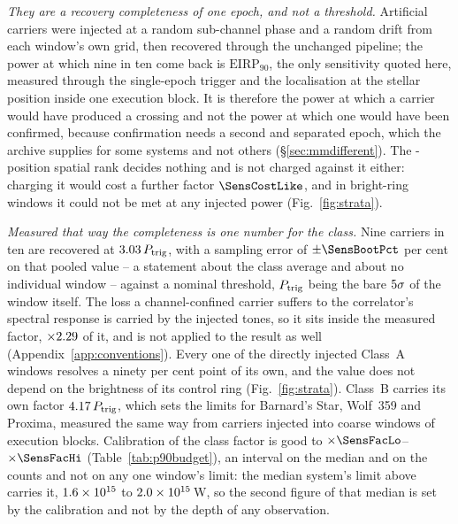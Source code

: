 \emph{They are a recovery completeness of one epoch, and not a threshold.}
Artificial carriers were injected at a random sub-channel phase and a random
drift from each window's own grid, then recovered through the unchanged
pipeline; the power at which nine in ten come back is $\mathrm{EIRP}_{90}$, the
only sensitivity quoted here, measured through the single-epoch trigger and the
localisation at the stellar position inside one execution block. It is
therefore the power at which a carrier would have produced a crossing and not
the power at which one would have been confirmed, because confirmation needs a
second and separated epoch, which the archive supplies for some systems and not
others (\S\ref{sec:mmdifferent}). The \NCtrl-position spatial rank decides
nothing and is not charged against it either: charging it would cost a further
factor $\SensCostLike$, and in \SensNRingHiUnres{} bright-ring windows it could
not be met at any injected power (Fig.~\ref{fig:strata}).

\emph{Measured that way the completeness is one number for the class.} Nine
carriers in ten are recovered at $3.03\,P_{\rm trig}$, with a
sampling error of $\pm\SensBootPct$ per cent on that pooled value -- a
statement about the class average and about no individual window -- against a
nominal threshold, $P_{\rm trig}$ being the bare $5\sigma$ of the
window itself. The loss a channel-confined carrier suffers to the correlator's
spectral response is carried by the injected tones, so it sits inside the
measured factor, $\times2.29$ of it, and is not applied to the result as
well (Appendix~\ref{app:conventions}). Every one of the \SensNInj{} directly
injected Class~A windows resolves a ninety per cent point of its own, and the
value does not depend on the brightness of its control ring
(Fig.~\ref{fig:strata}). Class~B carries its own factor $4.17\,P_{\rm
trig}$, which sets the limits for Barnard's Star, Wolf~359 and Proxima,
measured the same way from \SensNToneCoarse{} carriers injected into
\SensNInjCoarse{} coarse windows of \SensNInjCoarseBlock{} execution
blocks. Calibration of the class factor is good to
$\times\SensFacLo$--$\times\SensFacHi$ (Table~\ref{tab:p90budget}), an interval
on the median and on the counts and not on any one window's limit: the median
system's limit above carries it, $1.6\times10^{15}$ to $2.0\times10^{15}$\,W, so the
second figure of that median is set by the calibration and not by the depth of
any observation.

